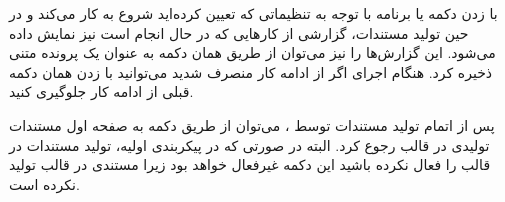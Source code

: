با زدن دکمه  یا  برنامه  با توجه به تنظیماتی که تعیین کرده‌اید شروع به کار می‌کند 
و در حین تولید مستندات، گزارشی از کارهایی که در حال انجام است نیز نمایش داده می‌شود. این گزارش‌ها را نیز می‌توان از طریق 
همان دکمه  به عنوان یک پرونده متنی ذخیره کرد. هنگام اجرای  اگر از ادامه کار منصرف شدید می‌توانید 
با زدن همان دکمه قبلی از ادامه کار  جلوگیری کنید.

پس از اتمام تولید مستندات توسط ، می‌توان از طریق دکمه  به صفحه اول مستندات تولیدی در 
قالب  رجوع کرد. البته در صورتی که در پیکربندی اولیه، تولید مستندات در قالب  را فعال نکرده باشید این دکمه 
غیرفعال خواهد بود زیرا  مستندی در قالب  تولید نکرده است.